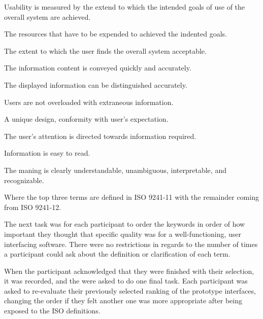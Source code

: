 \documentclass[nofilelist,dvipsnames]{cslthse-msc}
\begin{document}
            \begin{description}[style=nextline]
              \item[Effectiveness]{
                Usability is measured by the extend to which the
                intended goals of use of the overall system are achieved.
              }
              \item[Efficiency]{
                The resources that have to be expended to achieved the indented
                goals.
              }
              \item[Satisfaction]{
                The extent to which the user finds the overall system
                acceptable.
              }
              \item[Clarity]{
                  The information content is conveyed quickly and accurately.
              }
              \item[Discriminability]{
                  The displayed information can be distinguished
                  accurately.
              }
              \item[Conciseness]{
                  Users are not overloaded with extraneous information.
              }
              \item[Consistency]{
                  A unique design, conformity with user's expectation.
              }
              \item[Detectability]{
                  The user's attention is directed towards information
                  required.
              }
              \item[Legibility]{
                  Information is easy to read.
              }
              \item[Comprehensibility]{
                  The maning is clearly understandable, unambiguous,
                  interpretable, and recognizable.
              }
            \end{description}

        Where the top three terms are defined in ISO 9241-11 with the remainder
        coming from ISO 9241-12.

        The next task was for each participant to order the keywords
        in order of how important they thought that specific quality was for a
        well-functioning, user interfacing software. There were no restrictions
        in regards to the number of times a participant could ask about the
        definition or clarification of each term.

        When the participant acknowledged that they were finished with their
        selection, it was recorded, and the were asked to do one final task.
        Each participant was asked to re-evaluate their previously selected
        ranking of the prototype interfaces, changing the order if they felt
        another one was more appropriate after being exposed to the ISO
        definitions.
\end{document}
